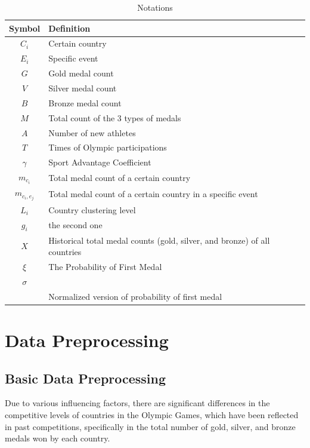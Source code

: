 \documentclass[12pt]{article}  %
\begin{document}
\begin{table}[!htbp]
\begin{center}
\caption{Notations}
\begin{tabular}{cl}
	\toprule
	\multicolumn{1}{m{3cm}}{\centering Symbol}
	&\multicolumn{1}{m{8cm}}{\centering Definition}\\
	\midrule
	$C_{i}$&Certain country\\
	$E_{i}$&Specific event\\
	$G$&Gold medal count\\
	$V$&Silver medal count\\
	$B$&Bronze medal count\\
	$M$&Total count of the 3 types of medals\\
	$A$&Number of new athletes\\
	$T$&Times of Olympic participations\\
    $\gamma$&Sport Advantage Coefficient\\
  	$ m_{c_{i}}$ &Total medal count of a certain country\\
	$ m_{c_{i},e_{j}}$ &Total medal count of a certain country in a specific event\\
	$L_{i}$&Country clustering level\\
    $g_{i}$&the second one\\
    $X$&Historical total medal counts (gold, silver, and bronze) of all countries\\
    $\xi$&The Probability of First Medal\\
    $\sigma$&                        \\
    $   $&Normalized version of probability of first medal         \\
	\bottomrule
\end{tabular}\label{tb:notation}
\end{center}
\end{table}

\section{Data Preprocessing}
\subsection{Basic Data Preprocessing}
Due to various influencing factors, there are significant differences in the competitive levels of countries in the Olympic Games, which have been reflected in past competitions, specifically in the total number of gold, silver, and bronze medals won by each country. 
\end{document}
